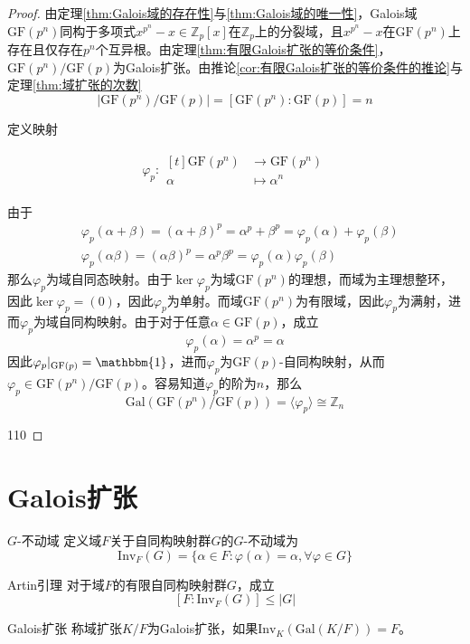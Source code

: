 \documentclass[lang = cn, scheme = chinese, thmcnt = section]{elegantbook}
\newcommand{\Z}{\mathbb{Z}}            %
\newcommand{\rang}{\rangle}            %
\newcommand{\function}[5]{
	\begin{align*}
		#1:\begin{aligned}[t]
			#2 &\longrightarrow #3\\
			#4 &\longmapsto #5
		\end{aligned}
	\end{align*}
}                                     %
\begin{document}
\begin{proof}
	由定理\ref{thm:Galois域的存在性}与\ref{thm:Galois域的唯一性}，Galois域$\text{GF}(p^n)$同构于多项式$x^{p^n}-x\in \Z_p[x]$在$\Z_p$上的分裂域，且$x^{p^n}-x$在$\text{GF}(p^n)$上存在且仅存在$p^n$个互异根。由定理\ref{thm:有限Galois扩张的等价条件}，$\text{GF}(p^n)/\text{GF}(p)$为Galois扩张。由推论\ref{cor:有限Galois扩张的等价条件的推论}与定理\ref{thm:域扩张的次数}
	$$
	|\text{GF}(p^n)/\text{GF}(p)|=[\text{GF}(p^n):\text{GF}(p)]=n
	$$
	
	定义映射
	\function{\varphi_p}{\text{GF}(p^n)}{\text{GF}(p^n)}{\alpha}{\alpha^n}
	由于
	\begin{align*}
		&\varphi_p(\alpha+\beta)=(\alpha+\beta)^p=\alpha^p+\beta^p=\varphi_p(\alpha)+\varphi_p(\beta)\\
		&\varphi_p(\alpha\beta)=(\alpha\beta)^p=\alpha^p\beta^p=\varphi_p(\alpha)\varphi_p(\beta)
	\end{align*}
	那么$\varphi_p$为域自同态映射。由于$\ker\varphi_p$为域$\text{GF}(p^n)$的理想，而域为主理想整环，因此$\ker\varphi_p=(0)$，因此$\varphi_p$为单射。而域$\text{GF}(p^n)$为有限域，因此$\varphi_p$为满射，进而$\varphi_p$为域自同构映射。由于对于任意$\alpha\in \text{GF}(p)$，成立
	$$
	\varphi_p(\alpha)=\alpha^p=\alpha
	$$
	因此$\varphi_p|_{\text{GF}(p)}=\mathbbm{1}$，进而$\varphi_p$为$\text{GF}(p)$-自同构映射，从而$\varphi_p\in \text{GF}(p^n)/\text{GF}(p)$。容易知道$\varphi_p$的阶为$n$，那么
	$$
	\text{Gal}(\text{GF}(p^n)/\text{GF}(p))=\langle \varphi_p \rang \cong \Z_n
	$$
	
	110
\end{proof}

\section{Galois扩张}

\begin{definition}{$G$-不动域}
	定义域$F$关于自同构映射群$G$的$G$-不动域为
	$$
	\text{Inv}_F(G)=\{ \alpha\in F:\varphi(\alpha)=\alpha,\forall \varphi\in G \}
	$$
\end{definition}

\begin{theorem}{Artin引理}
	对于域$F$的有限自同构映射群$G$，成立
	$$
	[F:\text{Inv}_F(G)]\le |G|
	$$
\end{theorem}

\begin{definition}{Galois扩张}
	称域扩张$K/F$为Galois扩张，如果$\text{Inv}_K(\text{Gal}(K/F))=F$。
\end{definition}
\end{document}

